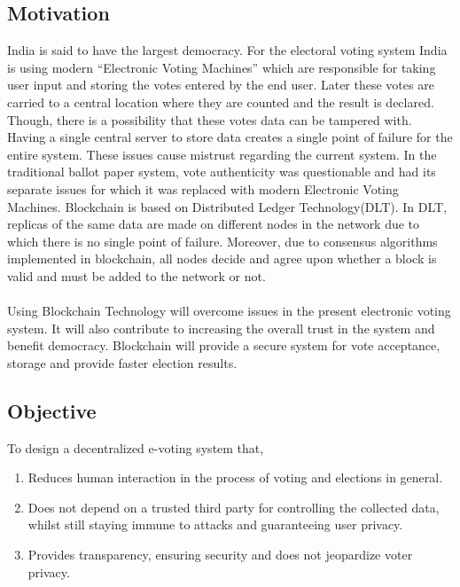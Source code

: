 \documentclass[oneside, 12pt]{book}
\begin{document}
\subsection{Motivation}
India is said to have the largest democracy. For the electoral voting system India is using modern “Electronic Voting Machines” which are responsible for taking user input and storing the votes entered by the end user. Later these votes are carried to a central location where they are counted and the result is declared. Though, there is a possibility that these votes data can be tampered with. Having a single central server to store data creates a single point of failure for the entire system. These issues cause mistrust regarding the current system. In the traditional ballot paper system, vote authenticity was questionable and had its separate issues for which it was replaced with modern Electronic Voting Machines. Blockchain is based on Distributed Ledger Technology(DLT). In DLT, replicas of the same data are made on different nodes in the network due to which there is no single point of failure. Moreover, due to consensus algorithms implemented in blockchain, all nodes decide and agree upon whether a block is valid and must be added to the network or not.
\\\\Using Blockchain Technology will overcome issues in the present electronic voting system. It will also contribute to increasing the overall trust in the system and benefit democracy. Blockchain will provide a secure system for vote acceptance, storage and provide faster election results.
\subsection{Objective}
To design a decentralized e-voting system that,
\begin{enumerate}
	\item Reduces human interaction in the process of voting and elections in general.
	\item Does not depend on a trusted third party for controlling the collected data, whilst still staying immune to attacks and guaranteeing user privacy.
	\item Provides transparency, ensuring security and does not jeopardize voter privacy.
\end{enumerate}
\end{document}
